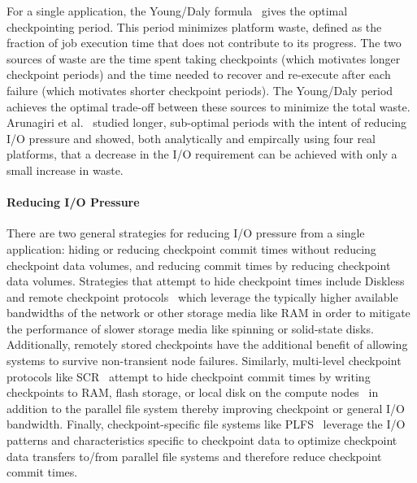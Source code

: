\documentclass[two]{article}
\begin{document}
For a single application, the Young/Daly formula~\cite{young74,daly04} gives the
optimal checkpointing period. This period minimizes platform waste, defined as the
fraction of job execution time that does not contribute to its progress.  The two
sources of waste are the time spent taking checkpoints (which motivates longer
checkpoint periods) and the time needed to recover and re-execute after each failure
(which motivates shorter checkpoint periods). The Young/Daly period achieves the
optimal trade-off between these sources to minimize the total waste. Arunagiri et
al.~\cite{Arunagiri2010} studied longer, sub-optimal periods with the intent of
reducing I/O pressure and showed, both analytically and empircally using four real
platforms, that a decrease in the I/O requirement can be achieved with only a small
increase in waste.

\paragraph*{Reducing I/O Pressure}

There are two general strategies for reducing I/O pressure from a single application:
hiding or reducing checkpoint commit times without reducing checkpoint data volumes,
and reducing commit times by reducing checkpoint data volumes.  Strategies that
attempt to hide checkpoint times include Diskless~\cite{Plank98Diskless} and remote
checkpoint protocols~\cite{Cornwell11RemoteBLCR} which leverage the typically higher
available bandwidths of the network or other storage media like RAM in order to
mitigate the performance of slower storage media like spinning or solid-state
disks. Additionally, remotely stored checkpoints have the additional benefit of
allowing systems to survive non-transient node failures. Similarly, multi-level
checkpoint protocols like SCR~\cite{Moody10SCR,Vaidya95TwoLevel} attempt to hide
checkpoint commit times by writing checkpoints to RAM, flash storage, or local disk
on the compute nodes~\cite{Kougkas2017} in addition to the parallel file system
thereby improving checkpoint or general I/O bandwidth.  Finally, checkpoint-specific
file systems like PLFS~\cite{Bent09PLFS} leverage the I/O patterns and
characteristics specific to checkpoint data to optimize checkpoint data transfers
to/from parallel file systems and therefore reduce checkpoint commit times.
\end{document}
